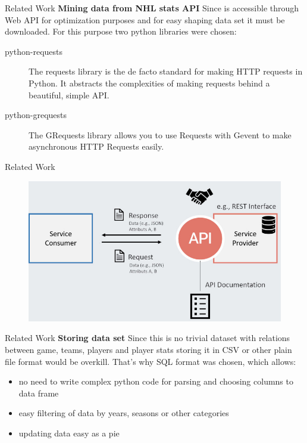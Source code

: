 \begin{frame}{Related Work}
    \textbf{Mining data from NHL stats API}
    \vspace{2em}
    Since is accessible through Web API for optimization purposes and for easy shaping data set it must be downloaded. For this purpose two python libraries were chosen:
    
    \begin{description}
        \item[python-requests] The requests library is the de facto standard for making HTTP requests in Python. It abstracts the complexities of making requests behind a beautiful, simple API.
        
        \item[python-grequests] The GRequests library allows you to use Requests with Gevent to make asynchronous HTTP Requests easily.
    \end{description}
\end{frame}    
    
\begin{frame}{Related Work}
    \begin{figure}[H]
        \includegraphics[width=\textwidth]{greg}
    \end{figure}
\end{frame}

\begin{frame}{Related Work}
    \textbf{Storing data set}
    \vspace{2em}
    Since this is no trivial dataset with relations between game, teams, players and player stats storing it in CSV or other plain file format would be overkill. That's why SQL format was chosen, which allows:
    
    \begin{itemize}
        \item no need to write complex python code for parsing and choosing columns to data frame
        \item easy filtering of data by years, seasons or other categories
        \item updating data easy as a pie
    \end{itemize}
\end{frame}

